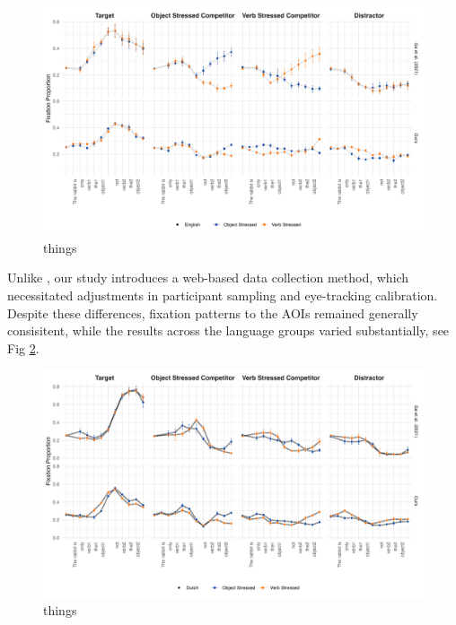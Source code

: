 \begin{figure}[H]  %
    \centering
    \includegraphics[width=\textwidth,height=\textheight,keepaspectratio]{viz/english_fix.png}
    \caption{things}
    \label{fig:english_fix}
\end{figure}

Unlike \cite{Ge2021}, our study introduces a web-based data collection method, which necessitated adjustments in participant sampling and eye-tracking calibration. Despite these differences, fixation patterns to the AOIs remained generally consisitent, while the results across the language groups varied substantially, see Fig \ref{fig:dutch_fix}.

\begin{figure}[H]  %
    \centering
    \includegraphics[width=\textwidth,height=\textheight,keepaspectratio]{viz/dutch_fix.png}
    \caption{things}
    \label{fig:dutch_fix}
\end{figure}

